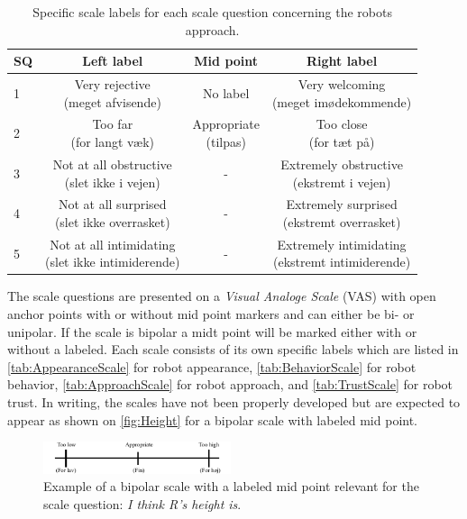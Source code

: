 \begin{table}[H]
	\centering
\caption{Specific scale labels for each scale question concerning the robots approach.}
	\label{tab:ApproachScale} 
	\begin{tabular}{l|c|c|c}
		SQ     & Left label & Mid point & Right label \\\hline
		1   & \makecell{Very rejective \\(meget afvisende)} & No label & \makecell{Very welcoming \\(meget imødekommende)}          \\\hline
		2   & \makecell{Too far \\(for langt væk)} & \makecell{Appropriate \\(tilpas)} & \makecell{Too close \\(for tæt på)}          \\\hline
		3   & \makecell{Not at all obstructive \\(slet ikke i vejen)}& -  & \makecell{Extremely obstructive \\(ekstremt i vejen)}  \\\hline
	 	4   & \makecell{Not at all surprised \\(slet ikke overrasket)} &  -  & \makecell{Extremely surprised \\(ekstremt overrasket)}       \\\hline
		5   & \makecell{Not at all intimidating \\(slet ikke intimiderende)} & - & \makecell{Extremely intimidating \\(ekstremt intimiderende)}           
	\end{tabular}
\end{table}
\noindent
%
The scale questions are presented on a \textit{Visual Analoge Scale} (VAS) with open anchor points with or without mid point markers and can either be bi- or unipolar. If the scale is bipolar a midt point will be marked either with or without a labeled. Each scale consists of its own specific labels which are listed in \autoref{tab:AppearanceScale} for robot appearance, \autoref{tab:BehaviorScale} for robot behavior, \autoref{tab:ApproachScale} for robot approach, and \autoref{tab:TrustScale} for robot trust. In writing, the scales have not been properly developed but are expected to appear as shown on \autoref{fig:Height} for a bipolar scale with labeled mid point. 
%
\begin{figure}[H]
\centering
\includegraphics[width = 0.49\textwidth]{Figure/HeightHoejde} 
\caption{Example of a bipolar scale with a labeled mid point relevant for the scale question: \textit{I think R's height is}.}
\label{fig:Height}
\end{figure}
